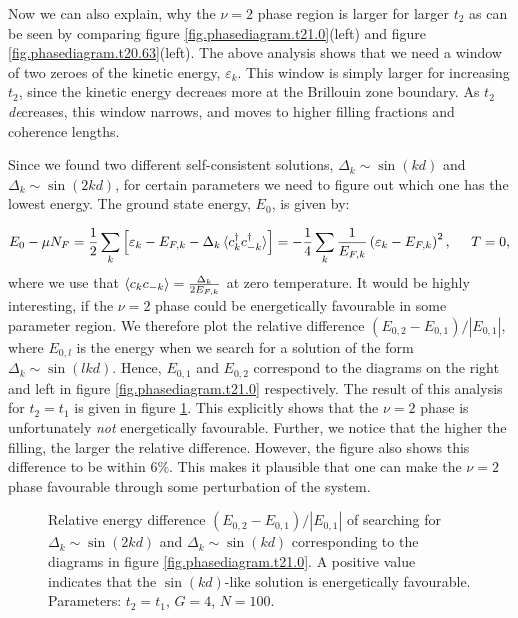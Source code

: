 Now we can also explain, why the $\nu = 2$ phase region is larger for larger $t_2$ as can be seen by comparing figure \ref{fig.phasediagram.t21.0}(left) and figure \ref{fig.phasediagram.t20.63}(left). The above analysis shows that we need a window of two zeroes of the kinetic energy, $\varepsilon_k$. This window is simply larger for increasing $t_2$, since the kinetic energy decreaes more at the Brillouin zone boundary. As $t_2$ \textit{de}creases, this window narrows, and moves to higher filling fractions and coherence lengths. 

Since we found two different self-consistent solutions, $\Delta_k \sim \sin(kd)$ and $\Delta_k \sim \sin(2kd)$, for certain parameters we need to figure out which one has the lowest energy. The ground state energy, $E_0$, is given by: 

\begin{equation}
E_0 - \mu N_F = \frac{1}{2}\sum_k \left[\varepsilon_k - E_{F,k} - \Delta_k\braket{c^\dagger_{k}c^\dagger_{-k}}\right] = -\frac{1}{4}\sum_k \frac{1}{E_{F,k}}\left( \varepsilon_k - E_{F,k} \right)^2, \hspace{0.5cm} T = 0, 
\label{eq.groundstategrandenergy.sumformula}
\end{equation}
where we use that $\braket{c_kc_{-k}} = \frac{\Delta_k}{2E_{F,k}}$ at zero temperature. It would be highly interesting, if the $\nu = 2$ phase could be energetically favourable in some parameter region. We therefore plot the relative difference $(E_{0,2} - E_{0,1})/|E_{0,1}|$, where $E_{0,l}$ is the energy when we search for a solution of the form $\Delta_k \sim \sin(lkd)$. Hence, $E_{0,1}$ and $E_{0,2}$ correspond to the diagrams on the right and left in figure \ref{fig.phasediagram.t21.0} respectively. The result of this analysis for $t_2 = t_1$ is given in figure \ref{fig.energydifference.t21.0}. This explicitly shows that the $\nu = 2$ phase is unfortunately \textit{not} energetically favourable. Further, we notice that the higher the filling, the larger the relative difference. However, the figure also shows this difference to be within $6\%$. This makes it plausible that one can make the $\nu = 2$ phase favourable through some perturbation of the system.   

\begin{figure}
\begin{center}

\caption{Relative energy difference $(E_{0,2} - E_{0,1})/|E_{0,1}|$ of searching for $\Delta_k \sim \sin(2kd)$ and $\Delta_k\sim \sin(kd)$ corresponding to the diagrams in figure \ref{fig.phasediagram.t21.0}. A positive value indicates that the $\sin(kd)$-like solution is energetically favourable. Parameters: $t_2 = t_1$, $G = 4$, $N = 100$. }
\label{fig.energydifference.t21.0}
\end{center}
\end{figure}

